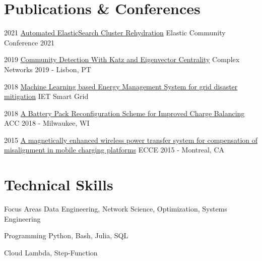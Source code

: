 \documentclass{tccv}
\begin{document}
\vspace{-15pt}
\section{Publications \& Conferences}
\begin{yearlist}
	\item{2021}
	{\href{https://www.youtube.com/watch?v=-hUjtAmHwyk}{Automated ElasticSearch Cluster \hspace{1cm} Rehydration}}
	{Elastic Community Conference 2021}
	
	\item{2019}
	{\href{https://github.com/markditsworth/CompleNet2019/blob/master/Presentation.pdf}{Community Detection With Katz and Eigenvector Centrality}}
	{Complex Networks 2019 - Lisbon, PT}
	
	\item{2018}
	{\href{https://digital-library.theiet.org/content/journals/10.1049/iet-stg.2018.0043}{Machine Learning based Energy Management System for grid disaster mitigation}}
	{IET Smart Grid}
	
	\item{2018}
	{\href{https://ieeexplore.ieee.org/document/8431612}{A Battery Pack Reconfiguration Scheme for Improved Charge Balancing}}
	{ACC 2018 - Milwaukee, WI}
	
	\item{2015}
	{\href{http://ieeexplore.ieee.org/document/7309840/}{A magnetically enhanced wireless power transfer system for compensation of misalignment in mobile charging platforms}}
	{ECCE 2015 - Montreal, CA}
	
\end{yearlist}

\section{Technical Skills}
\begin{factlist}
\item {Focus Areas}
	{Data Engineering, Network Science, Optimization, Systems Engineering}

\item{Programming}
    {Python, Bash, Julia, SQL}
    
\item{Cloud}
     {Lambda, Step-Function}



\end{factlist}
\end{document}
